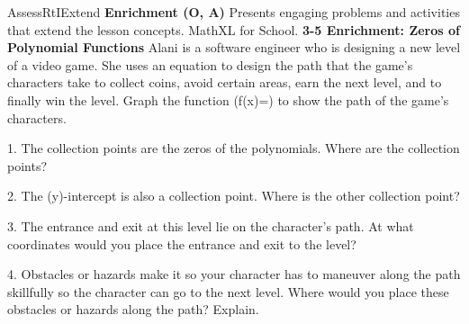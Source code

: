 \documentclass{article}
\newenvironment{te-addendum}[2]{}{}     %
\newcommand{\answer}[1]{}               %
\newcommand{\placeholder}[2]{}          %
\newcommand{\te}[1]{}                   %
\begin{document}
\begin{te-addendum}{Assess}{RtIExtend}
\textbf{Enrichment (O, A)}
Presents engaging problems and activities that extend the lesson concepts. MathXL for School.
\textbf{3-5 Enrichment: Zeros of Polynomial Functions}
Alani is a software engineer who is designing a new level of a video game. She uses an equation to design the path that the game's characters take to collect coins, avoid certain areas, earn the next level, and to finally win the level.
Graph the function (f(x)=) to show the path of the game's characters.
\placeholder{graph}{Magenta curve with x-intercepts -4,-1,4, local maximum near (-2.7,14), minimum near (2,-36); three x-intercepts labeled Collection point, y-intercept labeled Collection point y-intercept. x labels -8,-6,-2,O,2,6,8; y labels 20,10,-10,-20,-30,-40,-50,-60.}
1. The collection points are the zeros of the polynomials. Where are the collection points?
\answer{(x=-4,-1), and 4}
2. The (y)-intercept is also a collection point. Where is the other collection point?
\answer{(y=16)}
3. The entrance and exit at this level lie on the character's path. At what coordinates would you place the entrance and exit to the level?
\answer{Sample answer: entrance ((-5,-35)), exit ((4.2,20)).}
4. Obstacles or hazards make it so your character has to maneuver along the path skillfully so the character can go to the next level. Where would you place these obstacles or hazards along the path? Explain.
\answer{Sample answer: A water hazard could be placed above the (y)-axis under the parabola between ((-1.1,0)) to ((-3.999,0)). The hazard would be just left/right of the parabola graph. If you land in this hazard you will lose a life and have to start the level again.}
\te{Printed enrichment key includes x=-4 despite the original denominator being zero there; y-intercept key 16 conflicts with the plotted negative intercept. The key calls the cubic a parabola and says above the y-axis. Retained as printed.}
\end{te-addendum}
\end{document}
